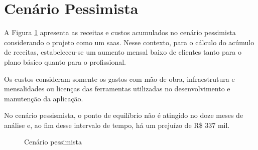 \section{Cenário Pessimista}

A Figura \ref{fig:cenario-pessimista} apresenta as receitas e custos acumulados no cenário pessimista considerando o projeto como um \gls{saas}. Nesse contexto, para o cálculo do acúmulo de receitas, estabeleceu-se um aumento mensal baixo de clientes tanto para o plano básico quanto para o profissional.

Os custos consideram somente os gastos com mão de obra, infraestrutura e mensalidades ou licenças das ferramentas utilizadas no desenvolvimento e manutenção da aplicação.

No cenário pessismista, o ponto de equilíbrio não é atingido no doze meses de análise e, ao fim desse intervalo de tempo, há um prejuízo de R\$ 337 mil.
\begin{figure}[h]
	\centering
	\caption{Cenário pessimista}
	\label{fig:cenario-pessimista}
\end{figure}